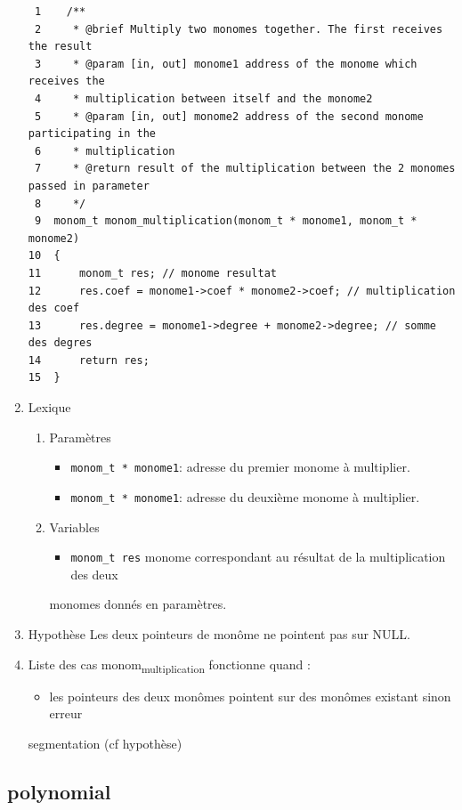 \documentclass[11pt]{article}
\begin{document}
\begin{enumerate}
\begin{verbatim}
 1    /**
 2     * @brief Multiply two monomes together. The first receives the result
 3     * @param [in, out] monome1 address of the monome which receives the
 4     * multiplication between itself and the monome2
 5     * @param [in, out] monome2 address of the second monome participating in the
 6     * multiplication
 7     * @return result of the multiplication between the 2 monomes passed in parameter
 8     */
 9  monom_t monom_multiplication(monom_t * monome1, monom_t * monome2)
10  {
11      monom_t res; // monome resultat
12      res.coef = monome1->coef * monome2->coef; // multiplication des coef
13      res.degree = monome1->degree + monome2->degree; // somme des degres
14      return res;
15  }
\end{verbatim}
\item Lexique
\label{sec:org72f74d0}
\begin{enumerate}
\item Paramètres
\label{sec:org0eb6a1f}
\begin{itemize}
\item \texttt{monom\_t * monome1}: adresse du premier monome à multiplier.
\item \texttt{monom\_t * monome1}: adresse du deuxième monome à multiplier.
\end{itemize}
\item Variables
\label{sec:orge489a55}
\begin{itemize}
\item \texttt{monom\_t res} monome correspondant au résultat de la multiplication des deux
\end{itemize}
monomes donnés en paramètres.
\end{enumerate}
\item Hypothèse
\label{sec:org8a1ed81}
Les deux pointeurs de monôme ne pointent pas sur NULL.

\item Liste des cas
\label{sec:org31e7ba1}
monom\textsubscript{multiplication} fonctionne quand :
\begin{itemize}
\item les pointeurs des deux monômes pointent sur des monômes existant sinon erreur
\end{itemize}
segmentation (cf hypothèse)
\end{enumerate}

\subsection{polynomial}
\label{sec:orgea7e522}
\end{document}
